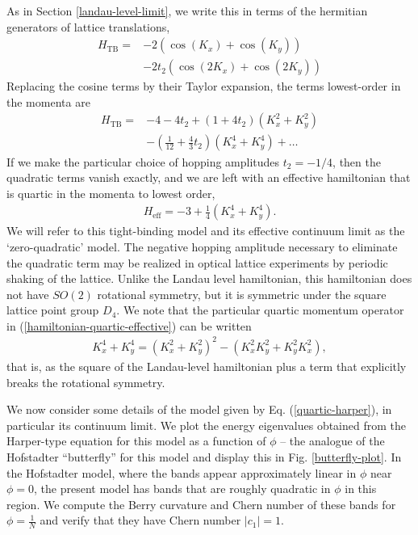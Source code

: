 \documentclass[aps,prb,twocolumn,letterpaper,twoside,nobalancelastpage,groupedaddress,amsmath,amssymb,floatfix,citeautoscript]{revtex4-1}
\begin{document}
As in Section \ref{landau-level-limit}, we write this in terms of the hermitian generators of lattice translations,
\begin{align}
H_{\text{TB}} = &-2\left(\cos(K_x) + \cos(K_y)\right)\\ &- 2t_2\left(\cos(2K_x) + \cos(2K_y)\right)
\end{align}
Replacing the cosine terms by their Taylor expansion, the terms lowest-order in the momenta are 
\begin{align}
H_{\text{TB}} = &-4 - 4 t_2 + (1 + 4t_2) \left(K_x^2 + K_y^2\right) \\
&- \left(\frac{1}{12} + \frac{4}{3}t_2\right) \left(K_x^4 + K_y^4\right) + \ldots
\end{align}
If we make the particular choice of hopping amplitudes $t_2 = -1/4$, then the quadratic terms vanish exactly, and we are left with an effective hamiltonian that is quartic in the momenta to lowest order,
\begin{align}
\label{hamiltonian-quartic-effective}
H_{\text{eff}} = -3 + \frac{1}{4} \left(K_x^4 + K_y^4\right).
\end{align}
We will refer to this tight-binding model and its effective continuum limit as the `zero-quadratic' model. The negative hopping amplitude necessary to eliminate the quadratic term may be realized in optical lattice experiments by periodic shaking of the lattice\cite{eckardt_colloquium_2017}. Unlike the Landau level hamiltonian, this hamiltonian does not have $SO(2)$ rotational symmetry, but it is symmetric under the square lattice point group $D_4$. We note that the particular quartic momentum operator in (\ref{hamiltonian-quartic-effective}) can be written
\begin{align}
K_x^4 + K_y^4 = \left(K_x^2 + K_y^2\right)^2 - \left(K_x^2K_y^2 + K_y^2K_x^2\right),
\end{align}
that is, as the square of the Landau-level hamiltonian plus a term that explicitly breaks the rotational symmetry.

We now consider some details of the model given by Eq. (\ref{quartic-harper}), in particular its continuum limit. We plot the energy eigenvalues obtained from the Harper-type equation for this model as a function of $\phi$ -- the analogue of the Hofstadter ``butterfly'' for this model\cite{hofstadter_energy_1976} and display this in Fig. \ref{butterfly-plot}. In the Hofstadter model, where the bands appear approximately linear in $\phi$ near $\phi = 0$, the present model has bands that are roughly quadratic in $\phi$ in this region. We compute the Berry curvature and Chern number of these bands for $\phi = \frac{1}{N}$ and verify that they have Chern number $|c_1| = 1$.
\end{document}
